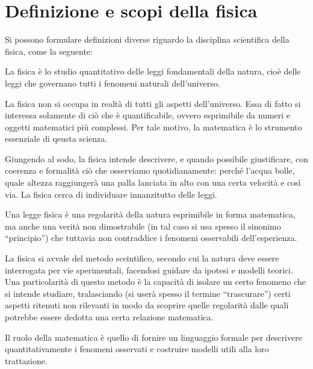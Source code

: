 \marginpar{\minitoc}

\section{Definizione e scopi della fisica}

Si possono formulare definizioni diverse riguardo la disciplina scientifica
della fisica, come la seguente:

\begin{tcolorbox}[colback = yellow!30, colframe = yellow!30!black, title = {Fisica}]
La fisica è lo studio quantitativo delle leggi fondamentali della natura, cioè
delle leggi che governano tutti i fenomeni naturali dell'universo.
\end{tcolorbox}

\noindent La fisica non si occupa in realtà di tutti gli aspetti dell'universo.
Essa di fatto si interessa solamente di ciò che è quantificabile, ovvero
esprimibile da numeri e oggetti matematici più complessi. Per tale motivo,
la matematica è lo strumento essenziale di qeusta scienza.

Giungendo al sodo, la fisica intende descrivere, e quando possibile giustificare,
con coerenza e formalità ciò che osserviamo quotidianamente: perché l'acqua
bolle, quale altezza raggiungerà una palla lanciata in alto con una certa
velocità e così via. La fisica cerca di individuare innanzitutto delle
leggi.

\begin{tcolorbox}[colback = yellow!30, colframe = yellow!30!black, title = {Legge}]
    Una legge fisica è una regolarità della natura esprimibile in forma
    matematica, ma anche una verità non dimostrabile (in tal caso si usa spesso il
    sinonimo ``principio'') che tuttavia non contraddice i
    fenomeni osservabili dell'esperienza.
\end{tcolorbox}

\noindent La fisica si avvale del metodo sceintifico, secondo cui la natura deve
essere interrogata per vie sperimentali, facendosi guidare da ipotesi e
modelli teorici. Una particolarità di questo metodo è la capacità di isolare
un certo fenomeno che si intende studiare, tralasciando (si userà spesso il
termine ``trascurare'') certi aspetti ritenuti non rilevanti in modo da
scoprire quelle regolarità dalle quali potrebbe essere dedotta una certa
relazione matematica.

Il ruolo della matematica è quello di fornire un linguaggio formale per descrivere
quantitativamente i fenomeni osservati e costruire modelli utili alla loro
trattazione.



